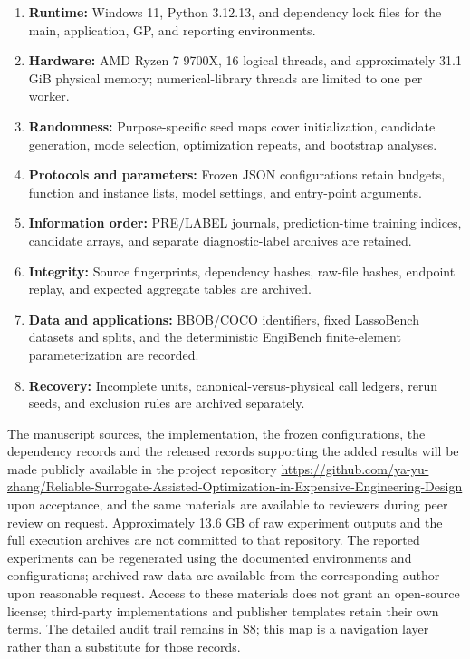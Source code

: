 \documentclass[suppldata]{interact}
\providecommand{\tightlist}{\setlength{\itemsep}{0pt}\setlength{\parskip}{0pt}}
\begin{document}
\begin{enumerate}
\def\labelenumi{\arabic{enumi}.}
\tightlist
\item
  \textbf{Runtime:} Windows 11, Python 3.12.13, and dependency lock files for the main, application, GP, and reporting environments.
\item
  \textbf{Hardware:} AMD Ryzen 7 9700X, 16 logical threads, and approximately 31.1 GiB physical memory; numerical-library threads are limited to one per worker.
\item
  \textbf{Randomness:} Purpose-specific seed maps cover initialization, candidate generation, mode selection, optimization repeats, and bootstrap analyses.
\item
  \textbf{Protocols and parameters:} Frozen JSON configurations retain budgets, function and instance lists, model settings, and entry-point arguments.
\item
  \textbf{Information order:} PRE/LABEL journals, prediction-time training indices, candidate arrays, and separate diagnostic-label archives are retained.
\item
  \textbf{Integrity:} Source fingerprints, dependency hashes, raw-file hashes, endpoint replay, and expected aggregate tables are archived.
\item
  \textbf{Data and applications:} BBOB/COCO identifiers, fixed LassoBench datasets and splits, and the deterministic EngiBench finite-element parameterization are recorded.
\item
  \textbf{Recovery:} Incomplete units, canonical-versus-physical call ledgers, rerun seeds, and exclusion rules are archived separately.
\end{enumerate}

The manuscript sources, the implementation, the frozen configurations, the dependency records and the released records supporting the added results will be made publicly available in the project repository \url{https://github.com/ya-yu-zhang/Reliable-Surrogate-Assisted-Optimization-in-Expensive-Engineering-Design} upon acceptance, and the same materials are available to reviewers during peer review on request. Approximately 13.6 GB of raw experiment outputs and the full execution archives are not committed to that repository. The reported experiments can be regenerated using the documented environments and configurations; archived raw data are available from the corresponding author upon reasonable request. Access to these materials does not grant an open-source license; third-party implementations and publisher templates retain their own terms. The detailed audit trail remains in S8; this map is a navigation layer rather than a substitute for those records.
\end{document}
